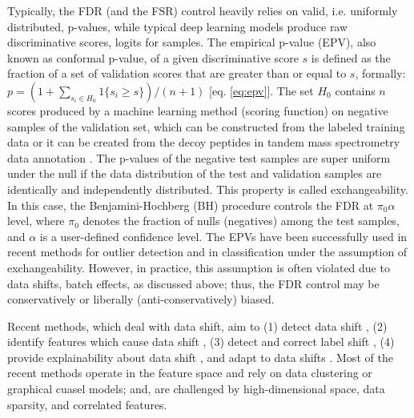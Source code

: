 \documentclass{article}
\begin{document}
Typically, the FDR (and the FSR) control heavily relies on valid, i.e. uniformly distributed, p-values, while typical deep learning models produce raw discriminative scores, logits for samples. %
The empirical p-value (EPV), also known as conformal p-value, of a given discriminative score $s$ is defined as the fraction of a set of validation scores that are greater than or equal to $s$, formally: $p=(1+\sum_{s_i\in H_0} {1}\{s_i \ge s\})/(n+1) \label{eq:epv}$ [eq. \ref{eq:epv}]. The set $H_0$ contains $n$ scores produced by a machine learning method (scoring function) on negative samples of the validation set, which can be constructed from the labeled training data or it can be created from the decoy peptides in tandem mass spectrometry data annotation \cite{elias2007target,danilova2019bias}. The p-values of the negative test samples are super uniform under the null if the data distribution of the test and validation samples are identically and independently distributed. This property is called exchangeability. In this case, the Benjamini-Hochberg (BH) procedure controls the FDR at $\pi_0\alpha$ level, where $\pi_0$ denotes the fraction of nulls (negatives) among the test samples, and $\alpha$ is a user-defined confidence level. The EPVs have been successfully used in recent methods for outlier detection \cite{bates2023testing,marandon2023adaptive} and in classification \cite{rava2021burden, angelopoulos2021learn} under the assumption of exchangeability.   However, in practice, this assumption is often violated due to data shifts, batch effects, as discussed above; thus, the FDR control may be conservatively or liberally (anti-conservatively) biased. 

Recent methods, which deal with data shift, aim to (1) detect data shift  \cite{ dasu2009change}, (2) identify features which cause data shift \cite{kulinski2020feature}, (3) detect and correct label shift \cite{lipton2018detecting}, (4) provide explainability about data shift \cite{budhathoki2021did,kulinski2023towards}, and adapt to data shifts \cite{sui2024unleashing, zhang2021adaptive, zhang2022memo}. Most of the recent methods operate in the feature space and rely on data clustering or graphical cuasel models; and, are challenged by high-dimensional space, data sparsity, and correlated features. 
\end{document}
